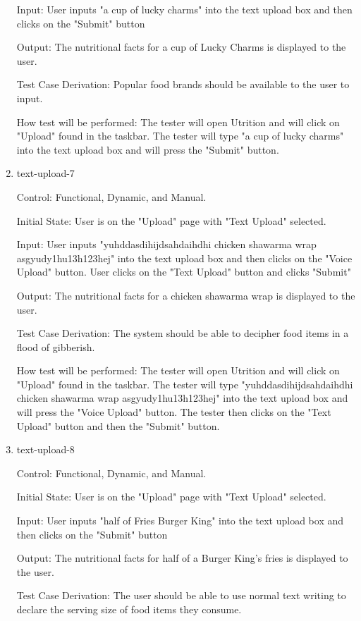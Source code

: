 \documentclass[12pt, titlepage]{article}
\begin{document}
\begin{enumerate}
	Input: User inputs "a cup of lucky charms" into the text upload box and then clicks on the "Submit" button
	
	Output: The nutritional facts for a cup of Lucky Charms is displayed to the user.
	
	Test Case Derivation: Popular food brands should be available to the user to input.
	
	How test will be performed: The tester will open Utrition and will click on "Upload" found in the taskbar. The tester will type "a cup of lucky charms" into the text upload box and will press the "Submit" button.
	
	\item{text-upload-7\\}
	
	Control: Functional, Dynamic, and Manual.
	
	Initial State: User is on the "Upload" page with "Text Upload" selected.
	
	Input: User inputs "yuhddasdihijdsahdaihdhi chicken shawarma wrap asgyudy1hu13h123hej" into the text upload box and then clicks on the "Voice Upload" button. User clicks on the "Text Upload" button and clicks "Submit"
	
	Output: The nutritional facts for a chicken shawarma wrap is displayed to the user.
	
	Test Case Derivation: The system should be able to decipher food items in a flood of gibberish.
	
	How test will be performed: The tester will open Utrition and will click on "Upload" found in the taskbar. The tester will type "yuhddasdihijdsahdaihdhi chicken shawarma wrap asgyudy1hu13h123hej" into the text upload box and will press the "Voice Upload" button. The tester then clicks on the "Text Upload" button and then the "Submit" button.
	
	\item{text-upload-8\\}
	
	Control: Functional, Dynamic, and Manual.
	
	Initial State: User is on the "Upload" page with "Text Upload" selected.
	
	Input: User inputs "half of Fries Burger King" into the text upload box and then clicks on the "Submit" button
	
	Output: The nutritional facts for half of a Burger King's fries is displayed to the user.
	
	Test Case Derivation: The user should be able to use normal text writing to declare the serving size of food items they consume.
	

\end{enumerate}
\end{document}
